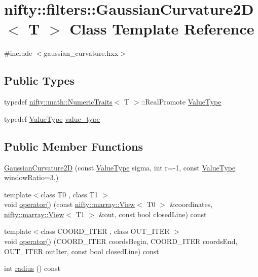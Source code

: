 \hypertarget{classnifty_1_1filters_1_1GaussianCurvature2D}{}\section{nifty\+:\+:filters\+:\+:Gaussian\+Curvature2\+D$<$ T $>$ Class Template Reference}
\label{classnifty_1_1filters_1_1GaussianCurvature2D}


{\ttfamily \#include $<$gaussian\+\_\+curvature.\+hxx$>$}

\subsection*{Public Types}
\begin{DoxyCompactItemize}
\item 
typedef \hyperlink{structnifty_1_1math_1_1NumericTraits}{nifty\+::math\+::\+Numeric\+Traits}$<$ T $>$\+::Real\+Promote \hyperlink{classnifty_1_1filters_1_1GaussianCurvature2D_af2739080c97506f5e72ebd4e69652311}{Value\+Type}
\item 
typedef \hyperlink{classnifty_1_1filters_1_1GaussianCurvature2D_af2739080c97506f5e72ebd4e69652311}{Value\+Type} \hyperlink{classnifty_1_1filters_1_1GaussianCurvature2D_affdbbda626530a7cd63878ca62f3682b}{value\+\_\+type}
\end{DoxyCompactItemize}
\subsection*{Public Member Functions}
\begin{DoxyCompactItemize}
\item 
\hyperlink{classnifty_1_1filters_1_1GaussianCurvature2D_a7405c5ba396d45a1f3e68db31835149e}{Gaussian\+Curvature2\+D} (const \hyperlink{classnifty_1_1filters_1_1GaussianCurvature2D_af2739080c97506f5e72ebd4e69652311}{Value\+Type} sigma, int r=-\/1, const \hyperlink{classnifty_1_1filters_1_1GaussianCurvature2D_af2739080c97506f5e72ebd4e69652311}{Value\+Type} window\+Ratio=3.)
\item 
{\footnotesize template$<$class T0 , class T1 $>$ }\\void \hyperlink{classnifty_1_1filters_1_1GaussianCurvature2D_a1d72ae55d7c0621a3fcdb869c6e7134a}{operator()} (const \hyperlink{classandres_1_1View}{nifty\+::marray\+::\+View}$<$ T0 $>$ \&coordinates, \hyperlink{classandres_1_1View}{nifty\+::marray\+::\+View}$<$ T1 $>$ \&out, const bool closed\+Line) const 
\item 
{\footnotesize template$<$class C\+O\+O\+R\+D\+\_\+\+I\+T\+E\+R , class O\+U\+T\+\_\+\+I\+T\+E\+R $>$ }\\void \hyperlink{classnifty_1_1filters_1_1GaussianCurvature2D_a65b9f3755e0a0ddb11867cd40aa048a6}{operator()} (C\+O\+O\+R\+D\+\_\+\+I\+T\+E\+R coords\+Begin, C\+O\+O\+R\+D\+\_\+\+I\+T\+E\+R coords\+End, O\+U\+T\+\_\+\+I\+T\+E\+R out\+Iter, const bool closed\+Line) const 
\item 
int \hyperlink{classnifty_1_1filters_1_1GaussianCurvature2D_a23a814f0b1b488d27cbdca14874f396d}{radius} () const 
\end{DoxyCompactItemize}


